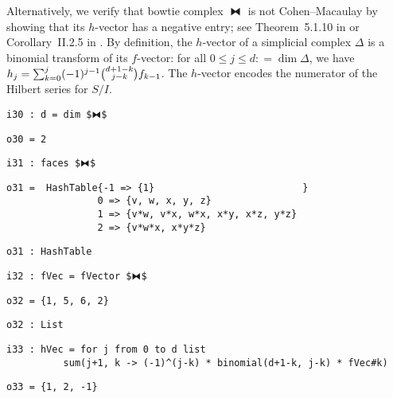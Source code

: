 \documentclass[12pt,leqno]{amsart}
\theoremstyle{definition}
\newcommand{\colequal}{\ensuremath{:\!=}}
\begin{document}
Alternatively, we verify that bowtie complex $⧓$ is not Cohen--Macaulay by
showing that its $h$-vector has a negative entry; see Theorem~5.1.10 in
\cite{BH} or Corollary~II.2.5 in \cite{Stanley}.  By definition, the
$h$-vector of a simplicial complex $\Delta$ is a binomial transform of its
$f\!$-vector: for all $0 \leqslant j \leqslant d \colequal \dim \Delta$, we have
$h_j = \sum_{k=0}^{j} (-1)^{j-1}
\smash{\tbinom{d+1-k}{\raisebox{3pt}{$\scriptstyle j-k$}}} f_{k-1}$.  The
$h$-vector encodes the numerator of the Hilbert series for $S/I$.
\begin{lstlisting}[xleftmargin=10pt, aboveskip=5.0pt, belowskip=1.5pt]
i30 : d = dim $⧓$
\end{lstlisting}
\begin{lstlisting}[xleftmargin=10pt, aboveskip=1.5pt, belowskip=1.5pt]
o30 = 2
\end{lstlisting}
\begin{lstlisting}[xleftmargin=10pt, aboveskip=1.5pt, belowskip=1.5pt]
i31 : faces $⧓$
\end{lstlisting}
\begin{lstlisting}[xleftmargin=10pt, lineskip=-10pt, aboveskip=4pt, belowskip=1pt]
o31 =  HashTable{-1 => {1}                          }
                0 => {v, w, x, y, z}
                1 => {v*w, v*x, w*x, x*y, x*z, y*z}
                2 => {v*w*x, x*y*z}
\end{lstlisting}
\begin{lstlisting}[xleftmargin=10pt, aboveskip=1.5pt, belowskip=1.5pt]
o31 : HashTable
\end{lstlisting}
\vfill
\begin{lstlisting}[xleftmargin=10pt, aboveskip=1.5pt, belowskip=1.5pt]
i32 : fVec = fVector $⧓$
\end{lstlisting}
\begin{lstlisting}[xleftmargin=10pt, aboveskip=1.5pt, belowskip=1.5pt]
o32 = {1, 5, 6, 2}
\end{lstlisting}
\begin{lstlisting}[xleftmargin=10pt, aboveskip=1.5pt, belowskip=1.5pt]
o32 : List
\end{lstlisting}
\begin{lstlisting}[xleftmargin=10pt, lineskip=-10pt, aboveskip=4pt, belowskip=1pt]
i33 : hVec = for j from 0 to d list 
          sum(j+1, k -> (-1)^(j-k) * binomial(d+1-k, j-k) * fVec#k)
\end{lstlisting}
\begin{lstlisting}[xleftmargin=10pt, aboveskip=1.5pt, belowskip=1.5pt]
o33 = {1, 2, -1}
\end{lstlisting}
\end{document}
